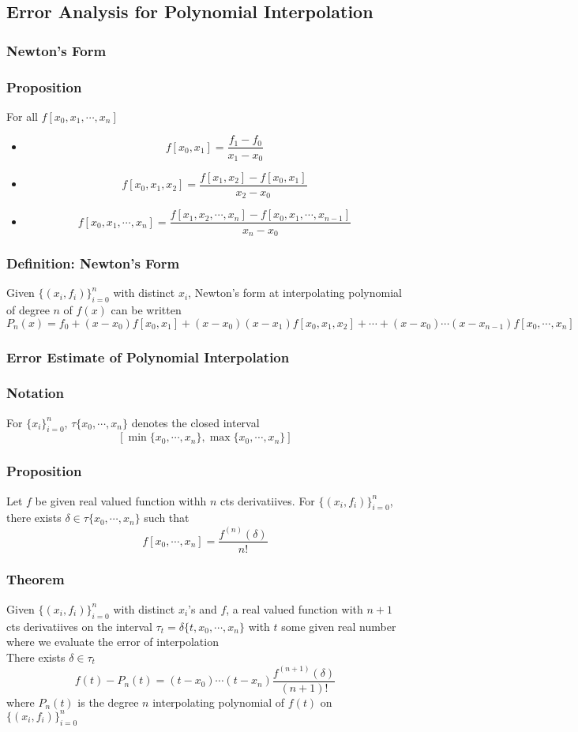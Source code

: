 \documentclass[11pt]{article}
\begin{document}
\subsection{Error Analysis for Polynomial Interpolation}
\subsubsection{Newton's Form}
\subsubsection*{Proposition}
For all $f[x_0,x_1,\cdots,x_n]$
\begin{itemize}
  \item \[f[x_0,x_1] = \dfrac{f_1-f_0}{x_1-x_0}\]
  \item \[f[x_0,x_1,x_2]=\dfrac{f[x_1,x_2]-f[x_0,x_1]}{x_2-x_0}\]
  \item \[f[x_0,x_1,\cdots,x_n] = \dfrac{f[x_1,x_2,\cdots,x_n]-f[x_0,x_1,\cdots,x_{n-1}]}{x_n-x_0}\]
\end{itemize}
\subsubsection*{Definition: Newton's Form}
Given $\{(x_i,f_i)\}_{i=0}^n$ with distinct $x_i$, Newton's form at interpolating polynomial of degree $n$ of $f(x)$ can be written 
\[P_n(x) = f_0+(x-x_0)f[x_0,x_1] + (x-x_0)(x-x_1)f[x_0,x_1,x_2] + \cdots + (x-x_0)\cdots(x-x_{n-1})f[x_0,\cdots,x_n]\]
\subsubsection{Error Estimate of Polynomial Interpolation}
\subsubsection*{Notation}
For $\{x_i\}_{i=0}^n$, $\tau\{x_0, \cdots,x_n\}$ denotes the closed interval 
\[[\min\{x_0,\cdots,x_n\}, \max\{x_0,\cdots,x_n\}]\]
\subsubsection*{Proposition}
Let $f$ be given real valued function withh $n$ cts derivatiives. For $\{(x_i,f_i)\}_{i=0}^n$, there exists $\delta\in\tau\{x_0,\cdots,x_n\}$ such that 
\[f[x_0,\cdots,x_n] = \frac{f^{(n)}(\delta)}{n!}\]
\subsubsection*{Theorem}
Given $\{(x_i,f_i)\}_{i=0}^n$ with distinct $x_i$'s and $f$, a real valued function with $n+1$ cts derivatiives on the interval $\tau_t = \delta\{t,x_0,\cdots,x_n\}$
with $t$ some given real number where we evaluate the error of interpolation \\
There exists $\delta\in\tau_t$
\[f(t) - P_n(t) = (t-x_0)\cdots(t-x_n)\frac{f^{(n+1)}(\delta)}{(n+1)!}\]
where $P_n(t)$ is the degree $n$ interpolating polynomial of $f(t)$ on $\{(x_i,f_i)\}_{i=0}^n$
\end{document}
